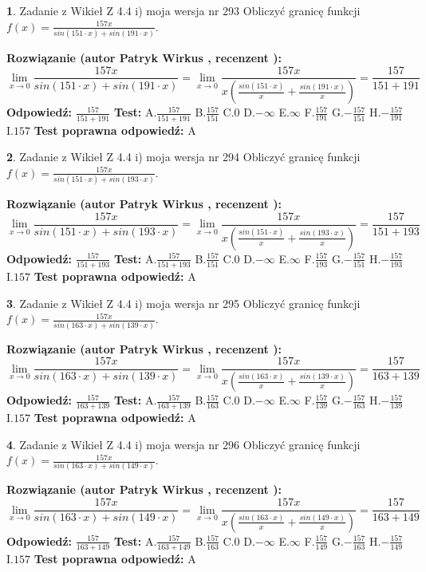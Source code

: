 \documentclass[12pt, a4paper]{article}
\theoremstyle{definition} %
\newtheorem{zad}{}
\newcommand{\zadStart}[1]{\begin{zad}#1\newline}
\newcommand{\zadStop}{\end{zad}}
\newcommand{\rozwStart}[2]{\noindent \textbf{Rozwiązanie (autor #1 , recenzent #2): }\newline}
\newcommand{\rozwStop}{\newline}
\newcommand{\odpStart}{\noindent \textbf{Odpowiedź:}\newline}
\newcommand{\odpStop}{\newline}
\newcommand{\testStart}{\noindent \textbf{Test:}\newline}
\newcommand{\testStop}{\newline}
\newcommand{\kluczStart}{\noindent \textbf{Test poprawna odpowiedź:}\newline}
\newcommand{\kluczStop}{\newline}
\begin{document}
\zadStart{Zadanie z Wikieł Z 4.4 i) moja wersja nr 293}
Obliczyć granicę funkcji $f(x)=\frac{157x}{sin(151\cdot x) +sin(191\cdot x)}$.
\zadStop
\rozwStart{Patryk Wirkus}{}
$$\lim\limits_{x\to 0}\frac{157x}{sin(151\cdot x) +sin(191\cdot x)}=\lim\limits_{x\to 0}\frac{157x}{x(\frac{sin(151\cdot x)}{x}+\frac{sin(191\cdot x)}{x})}=\frac{157}{151+191}$$
\rozwStop
\odpStart
$\frac{157}{151+191}$
\odpStop
\testStart
A.$\frac{157}{151+191}$
B.$\frac{157}{151}$
C.$0$
D.$-\infty$
E.$\infty$
F.$\frac{157}{191}$
G.$-\frac{157}{151}$
H.$-\frac{157}{191}$
I.$157$
\testStop
\kluczStart
A
\kluczStop



\zadStart{Zadanie z Wikieł Z 4.4 i) moja wersja nr 294}
Obliczyć granicę funkcji $f(x)=\frac{157x}{sin(151\cdot x) +sin(193\cdot x)}$.
\zadStop
\rozwStart{Patryk Wirkus}{}
$$\lim\limits_{x\to 0}\frac{157x}{sin(151\cdot x) +sin(193\cdot x)}=\lim\limits_{x\to 0}\frac{157x}{x(\frac{sin(151\cdot x)}{x}+\frac{sin(193\cdot x)}{x})}=\frac{157}{151+193}$$
\rozwStop
\odpStart
$\frac{157}{151+193}$
\odpStop
\testStart
A.$\frac{157}{151+193}$
B.$\frac{157}{151}$
C.$0$
D.$-\infty$
E.$\infty$
F.$\frac{157}{193}$
G.$-\frac{157}{151}$
H.$-\frac{157}{193}$
I.$157$
\testStop
\kluczStart
A
\kluczStop



\zadStart{Zadanie z Wikieł Z 4.4 i) moja wersja nr 295}
Obliczyć granicę funkcji $f(x)=\frac{157x}{sin(163\cdot x) +sin(139\cdot x)}$.
\zadStop
\rozwStart{Patryk Wirkus}{}
$$\lim\limits_{x\to 0}\frac{157x}{sin(163\cdot x) +sin(139\cdot x)}=\lim\limits_{x\to 0}\frac{157x}{x(\frac{sin(163\cdot x)}{x}+\frac{sin(139\cdot x)}{x})}=\frac{157}{163+139}$$
\rozwStop
\odpStart
$\frac{157}{163+139}$
\odpStop
\testStart
A.$\frac{157}{163+139}$
B.$\frac{157}{163}$
C.$0$
D.$-\infty$
E.$\infty$
F.$\frac{157}{139}$
G.$-\frac{157}{163}$
H.$-\frac{157}{139}$
I.$157$
\testStop
\kluczStart
A
\kluczStop



\zadStart{Zadanie z Wikieł Z 4.4 i) moja wersja nr 296}
Obliczyć granicę funkcji $f(x)=\frac{157x}{sin(163\cdot x) +sin(149\cdot x)}$.
\zadStop
\rozwStart{Patryk Wirkus}{}
$$\lim\limits_{x\to 0}\frac{157x}{sin(163\cdot x) +sin(149\cdot x)}=\lim\limits_{x\to 0}\frac{157x}{x(\frac{sin(163\cdot x)}{x}+\frac{sin(149\cdot x)}{x})}=\frac{157}{163+149}$$
\rozwStop
\odpStart
$\frac{157}{163+149}$
\odpStop
\testStart
A.$\frac{157}{163+149}$
B.$\frac{157}{163}$
C.$0$
D.$-\infty$
E.$\infty$
F.$\frac{157}{149}$
G.$-\frac{157}{163}$
H.$-\frac{157}{149}$
I.$157$
\testStop
\kluczStart
A
\kluczStop
\end{document}
